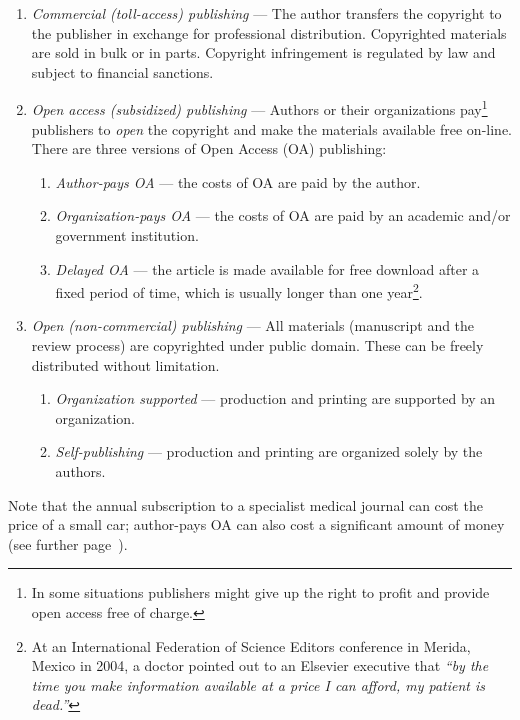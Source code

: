 \documentclass[graybox,envcountchap,sectrefs,UStrade]{svmono}
\begin{document}
\begin{enumerate}
\renewcommand{\labelenumi}{\textit{\Roman{enumi}}}
  \item \emph{Commercial (toll-access) publishing} --- The author transfers the copyright to the publisher in exchange for professional distribution. Copyrighted materials are sold in bulk or in parts. Copyright infringement is regulated by law and subject to financial sanctions.
  \item \emph{Open access (subsidized) publishing} --- Authors or their organizations pay\footnote{In some situations publishers might give up the right to profit and provide open access free of charge.} publishers to \emph{open} the copyright and make the materials available free on-line. There are three versions of Open Access (OA) publishing:
      \begin{enumerate}
        \item \emph{Author-pays OA} --- the costs of OA are paid by the author.
        \item \emph{Organization-pays OA} --- the costs of OA are paid by an academic and/or government institution.
        \item \emph{Delayed OA} --- the article is made available for free download after a fixed period of time, which is usually longer than one year\footnote{At an International Federation of Science Editors conference in Merida, Mexico in 2004, a doctor pointed out to an Elsevier executive that \emph{``by the time you make information available at a price I can afford, my patient is dead.''}}.
      \end{enumerate}
  \item \emph{Open (non-commercial) publishing} --- All materials (manuscript and the review process) are copyrighted under public domain. These can be freely distributed without limitation.
      \begin{enumerate}
        \item \emph{Organization supported} --- production and printing are supported by an organization.
        \item \emph{Self-publishing} --- production and printing are organized solely by the authors.
      \end{enumerate}
\end{enumerate}

Note that the annual subscription to a specialist medical journal can cost the price of a small car; author-pays OA can also cost a significant amount of money (see further page~\pageref{Tbl:publishing_models_comparison}).\par
\end{document}
